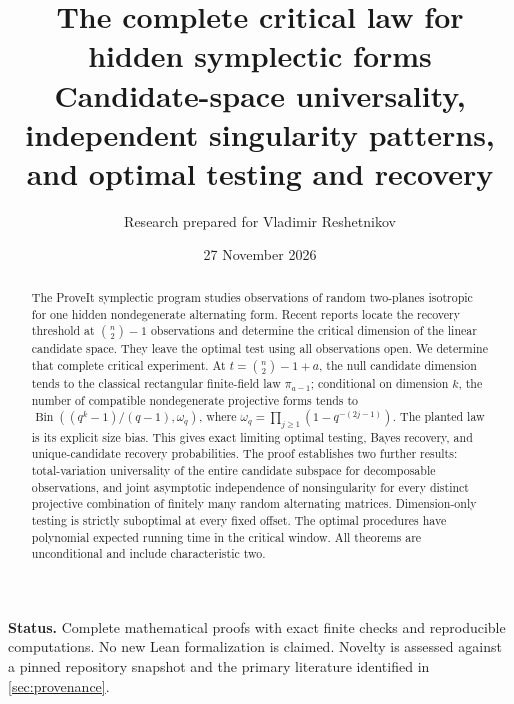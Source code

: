 \documentclass[11pt]{article}
\title{The complete critical law for hidden symplectic forms\\[5pt]
\large Candidate-space universality, independent singularity patterns,\\
and optimal testing and recovery}
\author{Research prepared for Vladimir Reshetnikov}
\date{27 November 2026}
\theoremstyle{definition}
\theoremstyle{remark}
\newcommand{\Bin}{\operatorname{Bin}}
\begin{document}
\maketitle
\begin{abstract}
The ProveIt symplectic program studies observations of random two-planes
isotropic for one hidden nondegenerate alternating form. Recent reports locate
the recovery threshold at $\binom n2-1$ observations and determine the critical
dimension of the linear candidate space. They leave the optimal test using all
observations open. We determine that complete critical experiment.
At $t=\binom n2-1+a$, the null candidate dimension tends to the classical
rectangular finite-field law $\pi_{a-1}$; conditional on dimension $k$, the
number of compatible nondegenerate projective forms tends to
$\Bin((q^k-1)/(q-1),\omega_q)$, where
$\omega_q=\prod_{j\ge1}(1-q^{-(2j-1)})$.
The planted law is its explicit size bias. This gives exact limiting optimal
testing, Bayes recovery, and unique-candidate recovery probabilities.
The proof establishes two further results: total-variation universality of
the entire candidate subspace for decomposable observations, and joint
asymptotic independence of nonsingularity for every distinct projective
combination of finitely many random alternating matrices.
Dimension-only testing is strictly suboptimal at every fixed offset.
The optimal procedures have polynomial expected running time in the critical
window. All theorems are unconditional and include characteristic two.
\end{abstract}
\vspace{3pt}
\noindent\textbf{Status.} Complete mathematical proofs with exact finite
checks and reproducible computations. No new Lean formalization is claimed.
Novelty is assessed against a pinned repository snapshot and the primary
literature identified in \cref{sec:provenance}.
\tableofcontents







\end{document}
